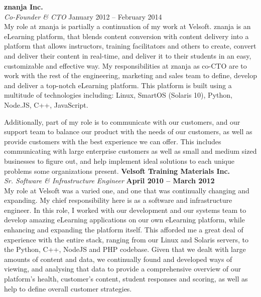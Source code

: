\documentclass[margin,line]{resume}
\begin{document}
\begin{resume}
	{\bf znanja Inc.} \vspace{2mm}\\\vspace{1mm}
	{\sl Co-Founder \& CTO} \hfill {January 2012 -- February 2014}
	\\
		My role at znanja is partially a continuation of my work at Velsoft. znanja is an eLearning platform, that blends content conversion with content delivery into a platform that allows instructors, training facilitators and others to create, convert and deliver their content in real-time, and deliver it to their students in an easy, customizable and effective way. My responsibilities at znanja as co-CTO are to work with the rest of the engineering, marketing and sales team to define, develop and deliver a top-notch eLearning platform. This platform is built using a multitude of technologies including: Linux, SmartOS (Solaris 10), Python, Node.JS, C++, JavaScript.

		Additionally, part of my role is to communicate with our customers, and our support team to balance our product with the needs of our customers, as well as provide customers with the best experience we can offer. This includes communicating with large enterprise customers as well as small and medium sized businesses to figure out, and help implement ideal solutions to each unique problems some organizations present.
\newpage
	{\bf Velsoft Training Materials Inc.} \vspace{2mm}\\\vspace{1mm}
	{\sl Sr. Software \& Infrastructure Engineer} \hfill {\bf April 2010 -- March 2012}
	\\
		My role at Velsoft was a varied one, and one that was continually changing and expanding. My chief responsibility here is as a software and infrastructure engineer. In this role, I worked with our development and our systems team to develop amazing eLearning applications on our own eLearning platform, while enhancing and expanding the platform itself. This afforded me a great deal of experience with the entire stack, ranging from our Linux and Solaris servers, to the Python, C++, NodeJS and PHP codebase. Given that we dealt with large amounts of content and data, we continually found and developed ways of viewing, and analysing that data to provide a comprehensive overview of our platform's health, customer's content, student responses and scoring, as well as help to define overall customer strategies.


\end{resume}
\end{document}
